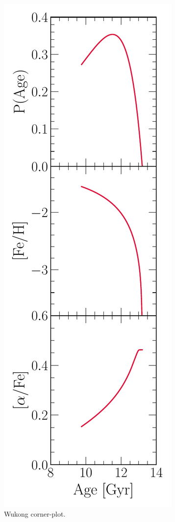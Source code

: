 \documentclass[ms.tex]{subfiles}
\begin{document}
\begin{figure}
\includegraphics[scale = 0.52]{wukong_agedist_amr.pdf}
\caption{Wukong corner-plot.}
\label{fig:wukong_corner}
\end{figure}
\end{document}
